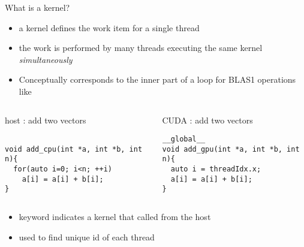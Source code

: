 \begin{frame}[fragile]{}
    \begin{info}{What is a kernel?}
    \begin{itemize}
        \item a kernel defines the work item for a single thread
        \item the work is performed by many threads executing the same kernel \emph{simultaneously}
        \item Conceptually corresponds to the inner part of a loop for BLAS1 operations like \axpy
    \end{itemize}
    \end{info}

    \vspace{-10pt}
    \begin{columns}[T]
        \begin{column}{0.5\textwidth}
            \begin{codecolumn}{host : add two vectors}
        \begin{lstlisting}[style=boxcudatiny]

void add_cpu(int *a, int *b, int n){
  for(auto i=0; i<n; ++i)
    a[i] = a[i] + b[i];
}
        \end{lstlisting}
            \end{codecolumn}
        \end{column}
        \begin{column}{0.5\textwidth}
            \begin{codecolumn}{CUDA : add two vectors}
        \begin{lstlisting}[style=boxcudatiny]
__global__
void add_gpu(int *a, int *b, int n){
  auto i = threadIdx.x;
  a[i] = a[i] + b[i];
}
        \end{lstlisting}
            \end{codecolumn}
        \end{column}
    \end{columns}

    \vspace{-2pt}
    \begin{info}{}
    \begin{itemize}
        \item {} keyword indicates a kernel that called from the host
        \item {} used to find unique id of each thread
    \end{itemize}
    \end{info}
\end{frame}

